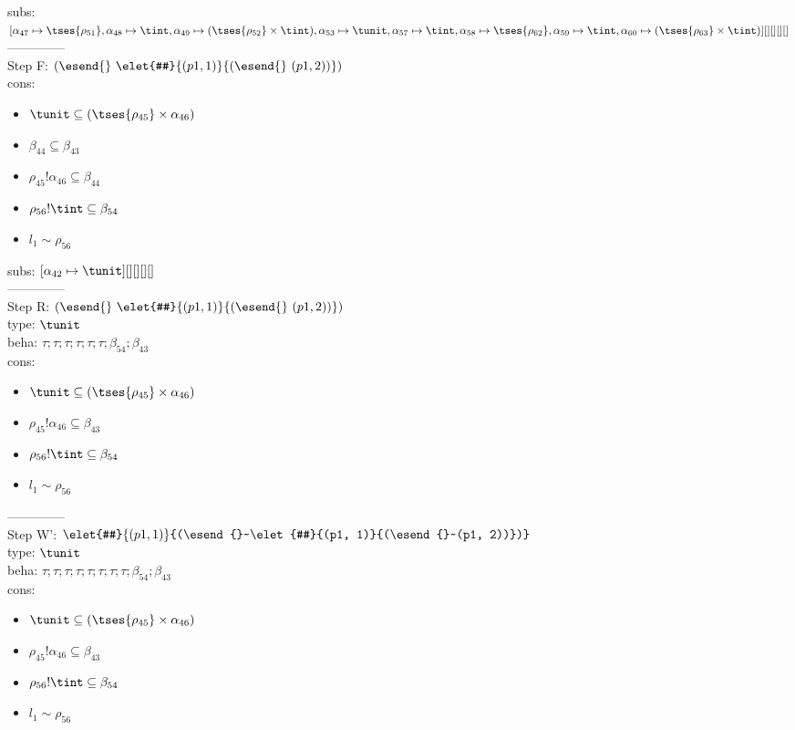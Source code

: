 \documentclass[12pt]{article}
\begin{document}
  subs:  $ [ \alpha_{47}\mapsto \tses{ \rho_{51}}, \alpha_{48}\mapsto\tint, \alpha_{49}\mapsto( \tses{ \rho_{52}} \times \tint), \alpha_{53}\mapsto\tunit, \alpha_{57}\mapsto\tint, \alpha_{58}\mapsto \tses{ \rho_{62}}, \alpha_{59}\mapsto\tint, \alpha_{60}\mapsto( \tses{ \rho_{63}} \times \tint)] [] [] [] [] $  
 \\--------------\\ 
Step F: $ (\esend{}~\elet{#}{(p1, 1)}{(\esend{}~(p1, 2))}) $
 \\ cons: \begin{itemize}
\item $ \tunit \subseteq ( \tses{ \rho_{45}} \times \alpha_{46}) $
\item $ \beta_{44} \subseteq \beta_{43} $
\item $ \rho_{45}!\alpha_{46} \subseteq \beta_{44} $
\item $ \rho_{56}!\tint \subseteq \beta_{54} $
\item $ l_{1} \sim\rho_{56} $
\end{itemize}
 subs:  $ [ \alpha_{42}\mapsto\tunit] [] [] [] [] $ 
  \\--------------\\ 
Step R: $ (\esend{}~\elet{#}{(p1, 1)}{(\esend{}~(p1, 2))}) $\\
  type: $ \tunit $ 
\\  beha: $ \tau; \tau; \tau; \tau; \tau; \tau; \beta_{54}; \beta_{43} $ 
\\  cons: \begin{itemize}
\item $ \tunit \subseteq ( \tses{ \rho_{45}} \times \alpha_{46}) $
\item $ \rho_{45}!\alpha_{46} \subseteq \beta_{43} $
\item $ \rho_{56}!\tint \subseteq \beta_{54} $
\item $ l_{1} \sim\rho_{56} $
\end{itemize} 
  --------------\\ 
Step W': $ \elet{#}{(p1, 1)}{(\esend{}~\elet{#}{(p1, 1)}{(\esend{}~(p1, 2))})} $\\
  type: $ \tunit $ 
\\  beha: $ \tau; \tau; \tau; \tau; \tau; \tau; \tau; \tau; \beta_{54}; \beta_{43} $ 
\\  cons: \begin{itemize}
\item $ \tunit \subseteq ( \tses{ \rho_{45}} \times \alpha_{46}) $
\item $ \rho_{45}!\alpha_{46} \subseteq \beta_{43} $
\item $ \rho_{56}!\tint \subseteq \beta_{54} $
\item $ l_{1} \sim\rho_{56} $
\end{itemize} 
\end{document}
